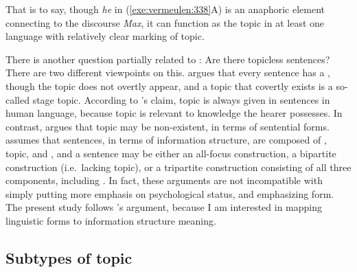 

\noindent That is to say, though \textit{he}
in (\ref{exe:vermeulen:338}A) is an anaphoric element connecting to the
discourse  \textit{Max}, it can function as the topic in at least
one language with relatively clear marking of topic.  



There is another question partially related to : Are
there topicless sentences?  There are two different viewpoints on
this.  \citet{erteschik:07} argues that every sentence has a ,
though the topic does not overtly appear, and a topic that covertly
exists is a so-called stage topic.  According to
\citeauthor{erteschik:07}'s claim, topic is always given in sentences
in human language, because topic is relevant to knowledge the hearer
possesses. In contrast, \citet{buring:99} argues that topic may be
non-existent, in terms of sentential forms. \citeauthor{buring:99}
assumes that sentences, in terms of information structure, are
composed of , topic, and , and a sentence may be
either an all-focus construction, a bipartite construction
(i.e.\ lacking topic), or a tripartite construction consisting of all
three components, including .  In fact, these 
arguments are not incompatible with \citeauthor{erteschik:07} simply
putting more emphasis on psychological status, and
\citeauthor{buring:99} emphasizing form. The present study follows
\citeauthor{buring:99}'s argument, because I am interested in mapping
linguistic forms to information structure meaning.





\subsection{Subtypes of topic}
\label{3:ssec:subtypes-topic}


